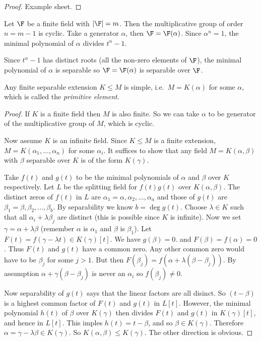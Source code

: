 \documentclass[a4paper]{article}
\begin{document}
\begin{proof}
  Example sheet.
\end{proof}

\begin{eg}
  Let \(\F\) be a finite field with \(|\F| = m\). Then the multiplicative group of order \(n = m - 1\) is cyclic. Take a generator \(\alpha\), then \(\F = \F(\alpha)\). Since \(\alpha^n = 1\), the minimal polynomial of \(\alpha\) divides \(t^n - 1\).

  Since \(t^n - 1\) has distinct roots (all the non-zero elements of \(\F\)), the minimal polynomial of \(\alpha\) is separable so \(\F = \F(\alpha)\) is separable over \(\F\).
\end{eg}

\begin{theorem}
  \label{thm:primitive}
  Any finite separable extension \(K \leq M\) is simple, i.e.\ \(M = K(\alpha)\) for some \(\alpha\), which is called the \emph{primitive element}.
\end{theorem}

\begin{proof}
  \label{proof:primitive}
  If \(K\) is a finite field then \(M\) is also finite. So we can take \(\alpha\) to be generator of the multiplicative group of \(M\), which is cyclic.

  Now assume \(K\) is an infinite field. Since \(K \leq M\) is a finite extension, \(M = K(\alpha_1, \dots, \alpha_n)\) for some \(\alpha_i\). It suffices to show that any field \(M = K(\alpha, \beta)\) with \(\beta\) separable over \(K\) is of the form \(K(\gamma)\).

  Take \(f(t)\) and \(g(t)\) to be the minimal polynomials of \(\alpha\) and \(\beta\) over \(K\) respectively. Let \(L\) be the splitting field for \(f(t)g(t)\) over \(K(\alpha, \beta)\). The distinct zeros of \(f(t)\) in \(L\) are \(\alpha_1 = \alpha, \alpha_2, \dots, \alpha_a\) and those of \(g(t)\) are \(\beta_1 = \beta, \beta_2, \dots, \beta_b\). By separability we know \(b = \deg g(t)\). Choose \(\lambda \in K\) such that all \(\alpha_i + \lambda \beta_j\) are distinct (this is possible since \(K\) is infinite). Now we set \(\gamma = \alpha + \lambda \beta\) (remember \(\alpha\) is \(\alpha_1\) and \(\beta\) is \(\beta_1\)). Let \(F(t) = f(\gamma - \lambda t) \in K(\gamma)[t]\). We have \(g(\beta) = 0\). and \(F(\beta) = f(\alpha) = 0\). Thus \(F(t)\) and \(g(t)\) have a common zero. Any other common zero would have to be \(\beta_j\) for some \(j > 1\). But then \(F(\beta_j) = f(\alpha + \lambda(\beta - \beta_j))\). By assumption \(\alpha + \gamma(\beta - \beta_j)\) is never an \(\alpha_i\) so \(f(\beta_j) \neq 0\).

  Now separability of \(g(t)\) says that the linear factors are all disinct. So \((t - \beta)\) is a highest common factor of \(F(t)\) and \(g(t)\) in \(L[t]\). However, the minimal polynomial \(h(t)\) of \(\beta\) over \(K(\gamma)\) then divides \(F(t)\) and \(g(t)\) in \(K(\gamma)[t]\), and hence in \(L[t]\). This imples \(h(t) = t - \beta\), and so \(\beta \in K(\gamma)\). Therefore \(\alpha = \gamma - \lambda \beta \in K(\gamma)\). So \(K(\alpha, \beta) \leq K(\gamma)\). The other direction is obvious.
\end{proof}
\end{document}
